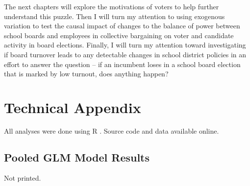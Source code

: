 The next chapters will explore the motivations of voters to help further understand 
this puzzle. Then I will turn my attention to using exogenous variation to test 
the causal impact of changes to the balance of power between school boards and 
employees in collective bargaining on voter and candidate activity 
in board elections. Finally, I will turn my attention toward investigating if 
board turnover leads to any detectable changes in school district policies in an 
effort to answer the question -- if an incumbent loses in a school board election 
that is marked by low turnout, does anything happen?

\section{Technical Appendix}
\label{sec:appendix}

All analyses were done using R \citep{cran}. Source code and data available online. 

\subsection{Pooled GLM Model Results}

Not printed.

